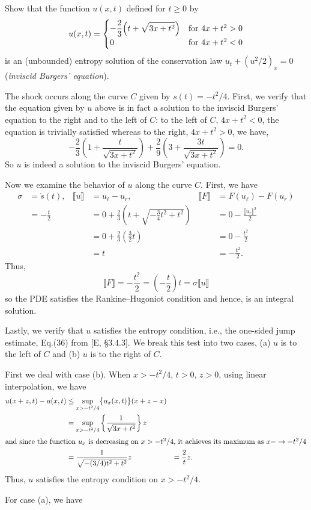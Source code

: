 \begin{problem}
  Show that the function \(u(x,t)\) defined for \(t\geq 0\) by
  \[
    u(x,t)=
    \begin{cases}
      \displaystyle-\frac{2}{3}\Bigl(t+\sqrt{3x+t^2}\Bigr)
      &\text{for \(4x+t^2>0\)}\\
      0
      &\text{for \(4x+t^2<0\)}
    \end{cases}
  \]
  is an (unbounded) entropy solution of the conservation law
  \(u_t+(u^2/2)_x=0\) (\emph{inviscid Burgers' equation}).
\end{problem}
\begin{solution}
  The shock occurs along the curve \(C\) given by \(s(t)=-t^2/4\). First,
  we verify that the equation given by \(u\) above is in fact a solution to
  the inviscid Burgers' equation to the right and to the left of \(C\): to
  the left of \(C\), \(4x+t^2<0\), the equation is trivially satisfied
  whereas to the right, \(4x+t^2>0\), we have,
  \[
    -\frac{2}{3}\left(1+\frac{t}{\sqrt{3x+t^2}}\right)
    +\frac{2}{9}\left(3+\frac{3t}{\sqrt{3x+t^2}}\right)
    =0.
  \]
  So \(u\) is indeed a solution to the inviscid Burgers' equation.

  Now we examine the behavior of \(u\) along the curve \(C\). First, we
  have
  \begin{align*}
    \sigma&=\dot s(t),
    &\llbracket u\rrbracket
    &=u_\ell-u_r,
    &\llbracket F\rrbracket
    &=F(u_\ell)-F(u_r)\\
          &=-\frac{t}{2}
    &&=0+\frac{2}{3}\left(t+\sqrt{-\tfrac{3}{4}t^2+t^2}\right)
    &&=0-\frac{\llbracket u_r\rrbracket^2}{2}\\
          &&
    &=0+\frac{2}{3}\left(\frac{3}{2}t\right)
    &&=0-\frac{t^2}{2}
    \\
          &&&=t&&=-\frac{t^2}{2}.
  \end{align*}
  Thus,
  \[
    \llbracket
    F\rrbracket=-\frac{t^2}{2}=\left(-\frac{t}{2}\right)t=\sigma\llbracket
    u\rrbracket
  \]
  so the PDE satisfies the Rankine--Hugoniot condition and hence, is an
  integral solution.

  Lastly, we verify that \(u\) satisfies the entropy condition, i.e., the
  one-sided jump estimate, Eq.\@ (36) from [E, \S 3.4.3]. We break this
  test into two cases, (a) \(u\) is to the left of \(C\) and (b) \(u\) is
  to the right of \(C\).

  First we deal with case (b). When \(x>-t^2/4\), \(t>0\), \(z>0\), using
  linear interpolation, we have
  \begin{align*}
    u(x+z,t)-u(x,t)
    &\leq\sup_{x>-t^2/4}\bigl\{u_x(x,t)\bigr\}(x+z-x)\\
    &=\sup_{x>-t^2/4}\left\{\frac{1}{\sqrt{3x+t^2}}\right\}z\\
    \intertext{and since the function \(u_x\) is decreasing on
    \(x>-t^2/4\), it achieves its maximum as \(x-\to -t^2/4\)}
    &=\frac{1}{\sqrt{-(3/4)t^2+t^2}}z
    &=\frac{2}{t}z.
  \end{align*}
  Thus, \(u\) satisfies the entropy condition on \(x>-t^2/4\).

  For case (a), we have
\end{solution}

